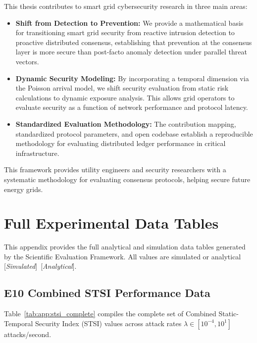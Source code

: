 \documentclass[12pt, oneside, a4paper]{report}
\theoremstyle{definition}
\theoremstyle{remark}
\newcommand{\analytical}{[\textit{Analytical}]}
\newcommand{\simulated}{[\textit{Simulated}]}
\begin{document}
This thesis contributes to smart grid cybersecurity research in three main areas:
\begin{itemize}
  \item \textbf{Shift from Detection to Prevention:} We provide a mathematical basis for transitioning smart grid security from reactive intrusion detection to proactive distributed consensus, establishing that prevention at the consensus layer is more secure than post-facto anomaly detection under parallel threat vectors.
  \item \textbf{Dynamic Security Modeling:} By incorporating a temporal dimension via the Poisson arrival model, we shift security evaluation from static risk calculations to dynamic exposure analysis. This allows grid operators to evaluate security as a function of network performance and protocol latency.
  \item \textbf{Standardized Evaluation Methodology:} The contribution mapping, standardized protocol parameters, and open codebase establish a reproducible methodology for evaluating distributed ledger performance in critical infrastructure.
\end{itemize}
This framework provides utility engineers and security researchers with a systematic methodology for evaluating consensus protocols, helping secure future energy grids.



\cleardoublepage

\appendix


\chapter{Full Experimental Data Tables}
\label{app:data_tables}

This appendix provides the full analytical and simulation data tables generated by the Scientific Evaluation Framework. All values are simulated or analytical \simulated\ \analytical.

\section{E10 Combined STSI Performance Data}
Table~\ref{tab:app:stsi_complete} compiles the complete set of Combined Static-Temporal Security Index (STSI) values across attack rates $\lambda \in [10^{-4}, 10^1]$ attacks/second.
\end{document}
